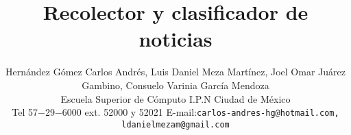 \title{\LARGE \bf Recolector y clasificador de noticias}

\author{ 

\parbox{5.5 in}{
  \centering 
  Hernández Gómez Carlos Andrés, Luis Daniel Meza Martínez, Joel Omar Juárez Gambino, Consuelo Varinia García Mendoza\\
  {\small Escuela Superior de Cómputo I.P.N Ciudad de México}\\
  Tel 57$-$29$-$6000 ext. 52000 y 52021 E-mail:{\tt\small carlos-andres-hg@hotmail.com, ldanielmezam@gmail.com}


  }
  \hspace*{ 0.5 in}
}
